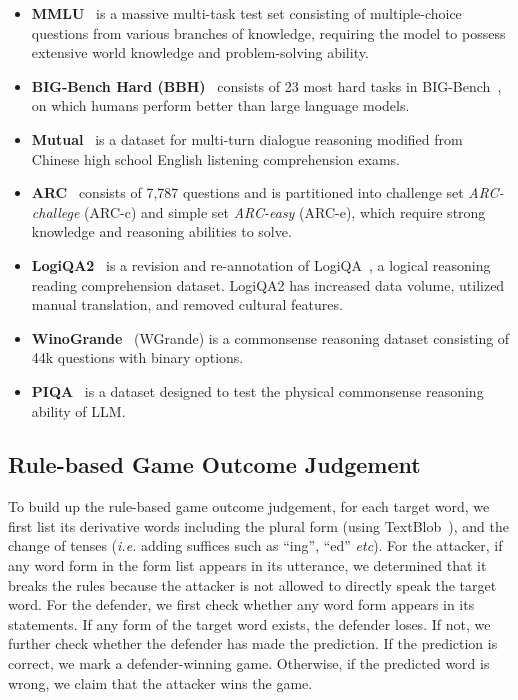 \documentclass{article}
\theoremstyle{plain}
\theoremstyle{definition}
\theoremstyle{remark}
\begin{document}
\begin{itemize}[leftmargin=14pt]
    \item \textbf{MMLU}~\citep{DBLP:journals/corr/abs-2009-03300} is a massive multi-task test set consisting of multiple-choice questions from various branches of knowledge, requiring the model to possess extensive world knowledge and problem-solving ability.
    \item \textbf{BIG-Bench Hard (BBH)}~\citep{suzgun2022challenging} consists of 23  most hard tasks in BIG-Bench~\citep{srivastava2022imitation},  on which humans perform better than large language models.
    \item \textbf{Mutual}~\citep{mutual} is a dataset for multi-turn dialogue reasoning modified from Chinese high school English listening comprehension exams.
    \item \textbf{ARC}~\citep{Clark2018ThinkYH} consists of 7,787 questions and is partitioned into challenge set \textit{ARC-challege} (ARC-c) and simple set \textit{ARC-easy} (ARC-e), which require strong knowledge and reasoning abilities to solve.
    \item \textbf{LogiQA2}~\citep{10174688} is a revision and re-annotation of LogiQA~\citep{liu2021logiqa}, a logical reasoning reading comprehension dataset. LogiQA2 has increased data volume, utilized manual translation, and removed cultural features.
    \item \textbf{WinoGrande}~\citep{sakaguchi2019winogrande} (WGrande) is a commonsense reasoning dataset consisting of 44k questions with binary options.
    \item \textbf{PIQA}~\citep{Bisk2020} is a dataset designed to test the physical commonsense reasoning ability of LLM.
\end{itemize}


\subsection{Rule-based Game Outcome Judgement} 
To build up the rule-based game outcome judgement, 
for each target word, we first list its derivative words including the plural form (using TextBlob~\citep{loria2018textblob}), and the change of tenses (\textit{i.e.} adding suffices such as ``ing'', ``ed'' \textit{etc}).
For the attacker, if any word form in the form list appears in its utterance, we determined that it breaks the rules because the attacker is not allowed to directly speak the target word.
For the defender, we first check whether any word form appears in its statements. If any form of the target word exists, the defender loses. If not, we further check whether the defender has made the prediction. If the prediction is correct, we mark a defender-winning game.  Otherwise, if the predicted word is wrong, we claim that the attacker wins the game. 
\vspace{-2mm}
\end{document}
